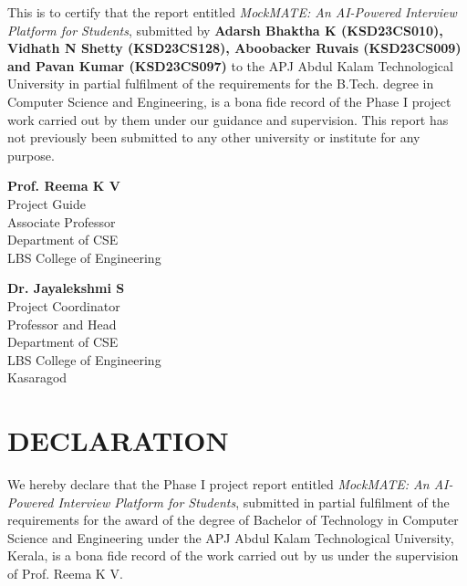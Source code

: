 \documentclass[12pt,a4paper,oneside]{report}
\begin{document}
This is to certify that the report entitled
\emph{MockMATE: An AI-Powered Interview Platform for Students},
submitted by \textbf{Adarsh Bhaktha K (KSD23CS010), Vidhath N Shetty
(KSD23CS128), Aboobacker Ruvais (KSD23CS009) and Pavan Kumar
(KSD23CS097)} to the APJ Abdul Kalam Technological University in
partial fulfilment of the requirements for the B.Tech. degree in
Computer Science and Engineering, is a bona fide record of the Phase I
project work carried out by them under our guidance and supervision.
This report has not previously been submitted to any other university
or institute for any purpose.

\vspace{1.8cm}

\noindent
\begin{minipage}[t]{0.36\textwidth}
    \vspace{0pt}
    \raggedright
    \textbf{Prof. Reema K V}\\
    Project Guide\\
    Associate Professor\\
    Department of CSE\\
    LBS College of Engineering
\end{minipage}%
\hfill
\begin{minipage}[t]{0.36\textwidth}
    \vspace{0pt}
    \raggedright
    \textbf{Dr. Jayalekshmi S}\\
    Project Coordinator\\
    Professor and Head\\
    Department of CSE\\
    LBS College of Engineering\\
    Kasaragod
\end{minipage}

\vfill
\clearpage

\chapter*{DECLARATION}
\thispagestyle{plain}
\vspace{0.35cm}
We hereby declare that the Phase I project report entitled \emph{MockMATE: An AI-Powered Interview Platform for Students}, submitted in partial fulfilment of the requirements for the award of the degree of Bachelor of Technology in Computer Science and Engineering under the APJ Abdul Kalam Technological University, Kerala, is a bona fide record of the work carried out by us under the supervision of Prof. Reema K V.
\end{document}
